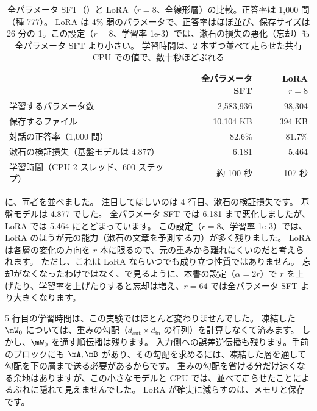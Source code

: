 \begin{table}[tbp]
\centering
\caption{全パラメータ SFT（）と LoRA（$r=8$、全線形層）の比較。正答率は 1,000 問（種 777）。
LoRA は 4\% 弱のパラメータで、正答率はほぼ並び、保存サイズは 26 分の 1。この設定（$r=8$、学習率 1e-3）では、漱石の損失の悪化（忘却）も全パラメータ SFT より小さい。
学習時間は、2 本ずつ並べて走らせた共有 CPU での値で、数十秒ほどぶれる}
\label{tab:lora-vs-full}
\small
\begin{tabular}{lrr}
\toprule
 & 全パラメータ SFT & LoRA $r=8$ \\
\midrule
学習するパラメータ数 & 2,583,936 & 98,304 \\
保存するファイル & 10,104 KB & 394 KB \\
対話の正答率（1,000 問） & 82.6\% & 81.7\% \\
漱石の検証損失（基盤モデルは 4.877） & 6.181 & 5.464 \\
学習時間（CPU 2 スレッド、600 ステップ） & 約 100 秒 & 107 秒 \\
\bottomrule
\end{tabular}
\end{table}

に、両者を並べました。
注目してほしいのは 4 行目、漱石の検証損失です。
基盤モデルは 4.877 でした。
全パラメータ SFT では 6.181 まで悪化しましたが、LoRA では 5.464 にとどまっています。
この設定（$r=8$、学習率 1e-3）では、LoRA のほうが元の能力（漱石の文章を予測する力）が多く残りました。
LoRA は各層の変化の方向を $r$ 本に限るので、元の重みから離れにくいのだと考えられます。
ただし、これは LoRA ならいつでも成り立つ性質ではありません。
忘却がなくなったわけではなく、で見るように、本書の設定（$\alpha=2r$）で $r$ を上げたり、学習率を上げたりすると忘却は増え、$r=64$ では全パラメータ SFT より大きくなります。

5 行目の学習時間は、この実験ではほとんど変わりませんでした。
凍結した $\mW_0$ については、重みの勾配（$d_{\text{out}}\times d_{\text{in}}$ の行列）を計算しなくて済みます。
しかし、$\mW_0$ を通す順伝播は残ります。
入力側への誤差逆伝播も残ります。手前のブロックにも $\mA,\mB$ があり、その勾配を求めるには、凍結した層を通して勾配を下の層まで送る必要があるからです。
重みの勾配を省ける分だけ速くなる余地はありますが、この小さなモデルと CPU では、並べて走らせたことによるぶれに隠れて見えませんでした。
LoRA が確実に減らすのは、メモリと保存です。

